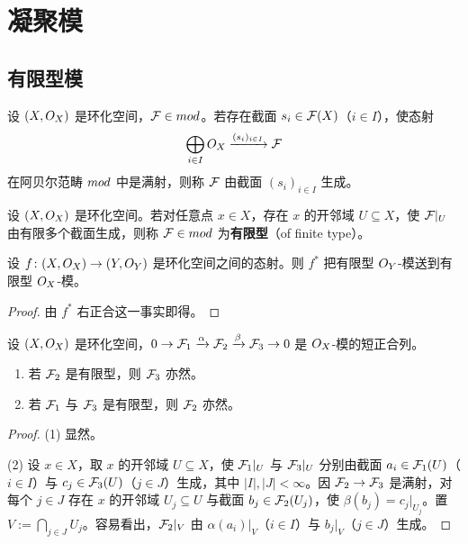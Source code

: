 
\section{凝聚模}\label{sec:16}

\subsection{有限型模}\label{sec:16.1}

\begin{definition}\label{def:16.1.1}
设 $(X,O_X)$ 是环化空间，$\mathcal{F}\in mod$。若存在截面 $s_i\in\mathcal{F}(X)$（$i\in I$），使态射
\[
\bigoplus_{i\in I}O_X \xrightarrow{(s_i)_{i\in I}} \mathcal{F}
\]
在阿贝尔范畴 $mod$ 中是满射，则称 $\mathcal{F}$ 由截面 ${(s_i)}_{i\in I}$ 生成。
\end{definition}

\begin{definition}\label{def:16.1.2}
设 $(X,O_X)$ 是环化空间。若对任意点 $x\in X$，存在 $x$ 的开邻域 $U\subseteq X$，使 $\mathcal{F}|_U$ 由有限多个截面生成，则称 $\mathcal{F}\in mod$ 为\textbf{有限型}（of finite type）。
\end{definition}

\begin{lemma}\label{lem:16.1.3}
设 $f\colon (X,O_X)\to(Y,O_Y)$ 是环化空间之间的态射。则 $f^*$ 把有限型 $O_Y$-模送到有限型 $O_X$-模。
\end{lemma}

\begin{proof}
由 $f^*$ 右正合这一事实即得。
\end{proof}

\begin{lemma}\label{lem:16.1.4}
设 $(X,O_X)$ 是环化空间，$0\to\mathcal{F}_1\xrightarrow{\alpha}\mathcal{F}_2\xrightarrow{\beta}\mathcal{F}_3\to 0$ 是 $O_X$-模的短正合列。
\begin{enumerate}[label=(\arabic*),leftmargin=2em,itemsep=0.25ex]
\item 若 $\mathcal{F}_2$ 是有限型，则 $\mathcal{F}_3$ 亦然。
\item 若 $\mathcal{F}_1$ 与 $\mathcal{F}_3$ 是有限型，则 $\mathcal{F}_2$ 亦然。
\end{enumerate}
\end{lemma}

\begin{proof}
(1) 显然。

(2) 设 $x\in X$，取 $x$ 的开邻域 $U\subseteq X$，使 $\mathcal{F}_1|_U$ 与 $\mathcal{F}_3|_U$ 分别由截面 $a_i\in\mathcal{F}_1(U)$（$i\in I$）与 $c_j\in\mathcal{F}_3(U)$（$j\in J$）生成，其中 $|I|,|J|<\infty$。因 $\mathcal{F}_2\to\mathcal{F}_3$ 是满射，对每个 $j\in J$ 存在 $x$ 的开邻域 $U_j\subseteq U$ 与截面 $b_j\in\mathcal{F}_2(U_j)$，使 $\beta(b_j)=c_j|_{U_j}$。置 $V:=\bigcap_{j\in J}U_j$。容易看出，$\mathcal{F}_2|_V$ 由 $\alpha(a_i)|_V$（$i\in I$）与 $b_j|_V$（$j\in J$）生成。
\end{proof}

